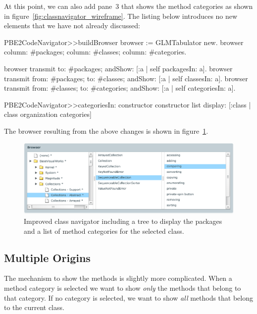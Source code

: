 \documentclass[a4paper,10pt,twoside]{book}
\begin{document}
At this point, we can also add pane~3 that shows the method categories
as shown in figure~\ref{fig:classnavigator_wireframe}. The listing
below introduces no new elements that we have not already discussed:

\begin{code}{}
PBE2CodeNavigator>>buildBrowser 
  browser := GLMTabulator new.
  browser
    column: #packages;
    column: #classes;
    column: #categories. 

  browser transmit to: #packages; andShow: [:a | self packagesIn: a].
  browser transmit from: #packages; to: #classes; andShow: [:a | self classesIn: a].
  browser transmit from: #classes; to: #categories; andShow: [:a | self categoriesIn: a].

PBE2CodeNavigator>>categoriesIn: constructor
  constructor list
    display:  [:class | class organization categories]  
\end{code}


The browser resulting from the above changes is shown in
figure~\ref{fig:treeandcategories}.

\begin{figure}[htbp]
\centerline{\includegraphics[width=\linewidth]{treeandcategories.pdf}}
\caption{	Improved class navigator including a tree to display the packages and a list of method categories for the selected class.}
\label{fig:treeandcategories}
\end{figure}



\subsection{Multiple Origins}

The mechanism to show the methods is slightly more complicated. When a
method category is selected we want to show \emph{only} the methods
that belong to that category. If no category is selected, we want to
show \emph{all} methods that belong to the current class.
\end{document}
